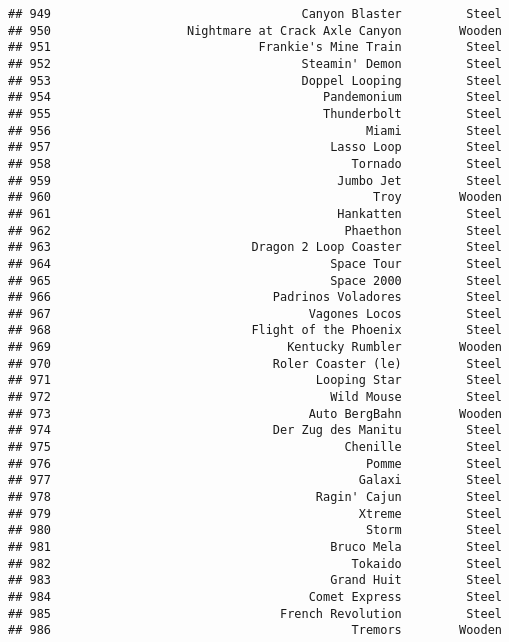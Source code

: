 \documentclass[
]{article}
\begin{document}
\begin{verbatim}
## 949                                   Canyon Blaster         Steel
## 950                   Nightmare at Crack Axle Canyon        Wooden
## 951                             Frankie's Mine Train         Steel
## 952                                   Steamin' Demon         Steel
## 953                                   Doppel Looping         Steel
## 954                                      Pandemonium         Steel
## 955                                      Thunderbolt         Steel
## 956                                            Miami         Steel
## 957                                       Lasso Loop         Steel
## 958                                          Tornado         Steel
## 959                                        Jumbo Jet         Steel
## 960                                             Troy        Wooden
## 961                                        Hankatten         Steel
## 962                                         Phaethon         Steel
## 963                            Dragon 2 Loop Coaster         Steel
## 964                                       Space Tour         Steel
## 965                                       Space 2000         Steel
## 966                               Padrinos Voladores         Steel
## 967                                    Vagones Locos         Steel
## 968                            Flight of the Phoenix         Steel
## 969                                 Kentucky Rumbler        Wooden
## 970                               Roler Coaster (le)         Steel
## 971                                     Looping Star         Steel
## 972                                       Wild Mouse         Steel
## 973                                    Auto BergBahn        Wooden
## 974                               Der Zug des Manitu         Steel
## 975                                         Chenille         Steel
## 976                                            Pomme         Steel
## 977                                           Galaxi         Steel
## 978                                     Ragin' Cajun         Steel
## 979                                           Xtreme         Steel
## 980                                            Storm         Steel
## 981                                       Bruco Mela         Steel
## 982                                          Tokaido         Steel
## 983                                       Grand Huit         Steel
## 984                                    Comet Express         Steel
## 985                                French Revolution         Steel
## 986                                          Tremors        Wooden

\end{verbatim}
\end{document}
